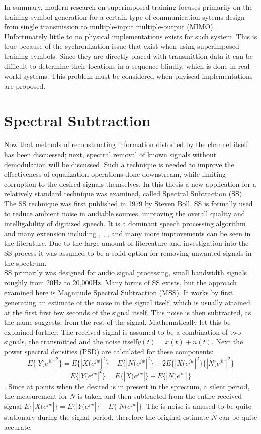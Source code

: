 In summary, modern research on superimposed training focuses primarily on the training symbol generation for a certain type of communication sytems design from single transmission to multiple-input multiple-output (MIMO).  Unfortunately little to no physical implementations exists for such system.  This is true because of the sychronization issue that exist when using superimposed training symbols.  Since they are directly placed with transmittion data it can be difficult to determine their locations in a sequence blindly, which is done in real world systems.  This problem must be considered when phyiscal implementations are proposed.\\

\section{Spectral Subtraction}

Now that methods of reconstructing information distorted by the channel itself has been discuessed; next, spectral removal of known signals without demodulation will be discussed.  Such a technique is needed to improve the effectiveness of equalization operations done downstream, while limiting corruption to the desired signals themselves.  In this thesis a new application for a relatively standard technique was examined, called Spectral Subtraction (SS).  The SS technique was first published in 1979 by Steven Boll\cite{boll}. SS is formally used to reduce ambient noise in audiable sources, improving the overall quality and intelligability of digitized speech.  It is a dominant speech processing algorithm and many extension including \cite{SSEXAMPLE}, \cite{SSEXAMPLE2}, \cite{SSEXAMPLE3}, and many more improvements can be seen in the literature.  Due to the large amount of litereature and investigation into the SS process it was assumed to be a solid option for removing unwanted signals in the spectrum.\\

SS primarily was designed for audio signal processing, small bandwidth signals roughly from 20Hz to 20,000Hz.  Many forms of SS exists, but the approach examined here is Magnitude Spectral Subtraction (MSS).  It works by first generating an estimate of the noise in the signal itself, which is usually attained at the first first few seconds of the signal itself.  This noise is then subtracted, as the name suggests, from the rest of the signal.  Mathematically let this be explained further.  The received signal is assumed to be a combination of two signals, the transmitted and the noise itself\(y(t) = x(t) + n(t)\).  Next the power spectral densities (PSD) are calculated for these components:
\[ E\{|Y(e^{jw}|^{2}\}= E\{|X(e^{jw}|^{2}\} + E\{|N(e^{jw}|^{2}\} + 2E\{|X(e^{jw}|^{2}\}\{|N(e^{jw}|^{2}\}\]
\[ E\{|Y(e^{jw}|^{2}\}= E\{|X(e^{jw}|\} + E\{|N(e^{jw}|\}  \]. 
Since at points when the desired is in present in the sprectum, a silent period, the measurement for \(N\) is taken and then subtracted from the entire received signal \(E\{|X(e^{jw}|\}= E\{|Y(e^{jw}|\} - E\{|N(e^{jw}|\}\).  The is noise is amused to be quite stationary during the signal period, therefore the original estimate \(\hat{N}\) can be quite accurate.\\

